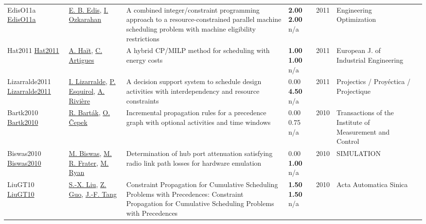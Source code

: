 {\begin{longtable}{p{3cm}p{5cm}p{10cm}p{1cm}rp{2.5cm}l}
EdisO11a \href{http://dx.doi.org/10.1080/03052151003759117}{EdisO11a} & \hyperref[auth:a346]{E. B. Edis}, \hyperref[auth:a348]{I. Ozkarahan} & A combined integer/constraint programming approach to a resource-constrained parallel machine scheduling problem with machine eligibility restrictions & \noindent{}\textbf{2.00} \textbf{2.00} n/a & 2011 & \cellcolor{red!20}Engineering Optimization & \cite{EdisO11a}\\
Hat2011 \href{http://dx.doi.org/10.1504/ejie.2011.042742}{Hat2011} & \hyperref[auth:a1162]{A. Haït}, \hyperref[auth:a6]{C. Artigues} & \cellcolor{green!10}A hybrid CP/MILP method for scheduling with energy costs & \noindent{}\textbf{1.00} \textbf{1.00} n/a & 2011 & European J. of Industrial Engineering & \cite{Hat2011}\\
Lizarralde2011 \href{http://dx.doi.org/10.3917/proj.007.0089}{Lizarralde2011} & \hyperref[auth:a1478]{I. Lizarralde}, \hyperref[auth:a1248]{P. Esquirol}, \hyperref[auth:a1479]{A. Rivière} & A decision support system to schedule design activities with interdependency and resource constraints & \noindent{}\textcolor{black!50}{0.00} \textbf{4.50} n/a & 2011 & Projectics / Proyéctica / Projectique & \cite{Lizarralde2011}\\
Bartk2010 \href{http://dx.doi.org/10.1177/0142331208100099}{Bartk2010} & \hyperref[auth:a1063]{R. Barták}, \hyperref[auth:a1557]{O. Čepek} & \cellcolor{green!10}Incremental propagation rules for a precedence graph with optional activities and time windows & \noindent{}\textcolor{black!50}{0.00} 0.75 n/a & 2010 & Transactions of the Institute of Measurement and Control & \cite{Bartk2010}\\
Biswas2010 \href{http://dx.doi.org/10.1177/0037549710373601}{Biswas2010} & \hyperref[auth:a2019]{M. Biswas}, \hyperref[auth:a2020]{M. R. Frater}, \hyperref[auth:a2021]{M. Ryan} & Determination of hub port attenuation satisfying radio link path losses for hardware emulation & \noindent{}\textcolor{black!50}{0.00} \textbf{1.00} n/a & 2010 & SIMULATION & \cite{Biswas2010}\\
LiuGT10 \href{http://dx.doi.org/10.3724/sp.j.1004.2010.00603}{LiuGT10} & \hyperref[auth:a1220]{S.-X. Liu}, \hyperref[auth:a1221]{Z. Guo}, \hyperref[auth:a1222]{J.-F. Tang} & Constraint Propagation for Cumulative Scheduling Problems with Precedences: Constraint Propagation for Cumulative Scheduling Problems with Precedences & \noindent{}\textbf{1.50} \textbf{1.50} n/a & 2010 & \cellcolor{red!20}Acta Automatica Sinica & \cite{LiuGT10}\\

\end{longtable}}
